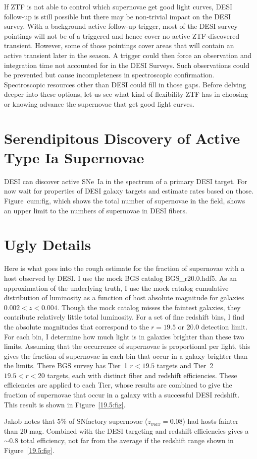 \documentclass{article}   	%
\begin{document}
If ZTF is not able to control which supernovae get good light curves,
DESI follow-up is still possible but there may be non-trivial
impact on the DESI survey. 
With a background active follow-up trigger, 
most of the DESI survey pointings  will not be of a triggered  and hence cover
no active ZTF-discovered transient.  However, some of those pointings
cover areas that will contain an active transient later in the season.  
A trigger could then force an observation and integration time not accounted for in the DESI Surveys.  Such observations
could be prevented but cause incompleteness in spectroscopic confirmation.
Spectroscopic resources other than DESI could fill in those gaps.
Before delving deeper into these options, let us see what kind of flexibility  ZTF has in choosing or knowing advance the
supernovae that get good light curves.

\section{Serendipitous Discovery of Active Type Ia Supernovae}
DESI can discover active SNe~Ia in the spectrum of a primary DESI target.
For now wait for properties of DESI galaxy targets and estimate rates based on those.  Figure~{cum:fig}, which shows the total number of 
supernovae in the field, shows an upper limit to the numbers of supernovae in DESI fibers.

\appendix
\section{Ugly Details}
\label{details:sec}
\color{red}
Here is what goes into the rough estimate for the fraction of supernovae with a host observed by DESI.  I use the mock BGS catalog BGS\_r20.0.hdf5.
As an  approximation of the underlying truth, I use the mock catalog 
cumulative distribution of luminosity as a function of host absolute magnitude for galaxies $0.002<z<0.004$.  Though the mock catalog misses
the  faintest galaxies, they
contribute relatively little total luminosity.
For a set of fine redshift bins, I find the absolute magnitudes that correspond to the $r=19.5$ or $20.0$ detection limit.  For each bin,
I determine how much light is in galaxies brighter than these two limits.  Assuming that the occurrence of supernovae is proportional per light, this
gives the fraction of supernovae in each bin that occur in a galaxy brighter than the limits.  There BGS survey has Tier~1 $r<19.5$ targets and Tier~2
$19.5<r<20$ targets, each with distinct fiber and redshift efficiencies.  These efficiencies are applied to each Tier, whose results are combined to give
the fraction of supernovae that occur in a galaxy with a successful DESI redshift.  This result is shown in Figure~\ref{19.5:fig}.

Jakob notes that 5\% of SNfactory supernovae ($z_{max}=0.08$) had hosts fainter than 20 mag.  Combined with the DESI targeting and redshift
efficiencies gives a  $\sim 0.8$ total efficiency, not far from the average if the redshift range shown in Figure~\ref{19.5:fig}.

\color{black}
\end{document}
